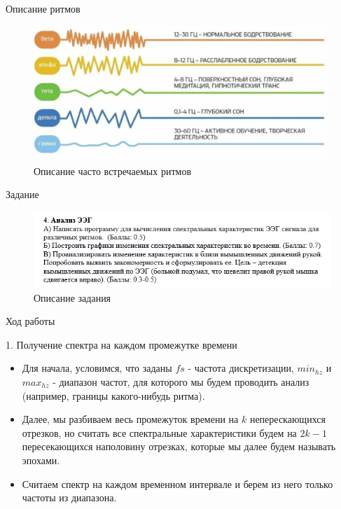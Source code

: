 \documentclass[10pt, red]{beamer}
\begin{document}
\begin{frame}{Описание ритмов}

\begin{figure}
    \centering
    \includegraphics[width=1\linewidth]{src/Описание-ритмов.png}
    \caption{Описание часто встречаемых ритмов}
    \label{pic:rhythmes-depic}
\end{figure}
    
\end{frame}

\begin{frame}{Задание}

\begin{figure}
    \centering
    \includegraphics[width=1\linewidth]{src/Задание.png}
    \caption{Описание задания}
    \label{pic:task}
\end{figure}
    
\end{frame}

\begin{frame}{Ход работы}

1. Получение спектра на каждом промежутке времени
\begin{itemize}
    \item Для начала, условимся, что заданы $fs$ - частота дискретизации, $min_{hz}$ и $max_{hz}$ - диапазон частот, для которого мы будем проводить анализ (например, границы какого-нибудь ритма).
    \item Далее, мы разбиваем весь промежуток времени на $k$ неперескающихся отрезков, но считать все спектральные характеристики будем на $2k - 1$ пересекающихся наполовину отрезках, которые мы далее будем называть эпохами.
    \item Считаем спектр на каждом временном интервале и берем из него только частоты из диапазона.
\end{itemize}
    
\end{frame}
\end{document}
